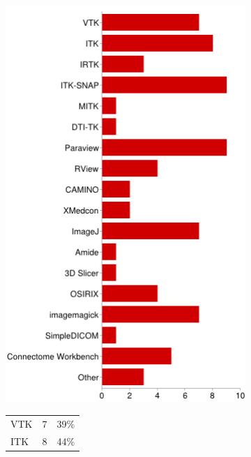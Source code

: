 \documentclass[MSc,paper=a4,pagesize=auto]{icldt}
\begin{document}
\begin{figure}[htbp!]
\centering
\begin{subfigure}{0.4\textwidth}
    \centering
    \includegraphics[width=1\linewidth]{resources/3-medical_imaging_packages}
\end{subfigure}%
\centering
\begin{subfigure}{\textwidth}
    \centering
   	\begin{tabular}{ l c p{4cm} }
	VTK					&7&39\% \\
	ITK					&8&44\% \\

\end{tabular}
\end{subfigure}
\end{figure}
\end{document}
